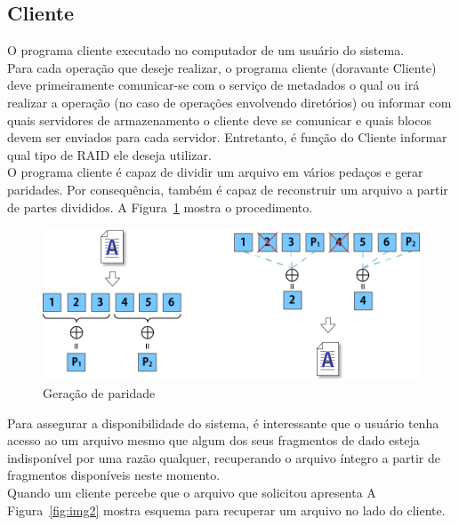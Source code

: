 	\subsection{Cliente}
	O programa cliente executado no computador de um usuário do sistema. 
	\\
	
	Para cada operação que deseje realizar, o programa cliente (doravante Cliente) deve primeiramente comunicar-se com o serviço de metadados o qual ou irá realizar a operação (no caso de operações envolvendo diretórios) ou informar com quais servidores de armazenamento o cliente deve se comunicar e quais blocos devem ser enviados para cada servidor. Entretanto, é função do Cliente informar qual tipo de RAID ele deseja utilizar.
	\\
	
	O programa cliente é capaz de dividir um arquivo em vários pedaços e gerar paridades. Por consequência, também é capaz de reconstruir um arquivo a partir de partes divididos. A Figura~\ref{fig:img6} mostra o procedimento.
	\begin{figure}[htb]
		\begin{center}
			
			\includegraphics[clip,width=15.0cm]{images/image6.png}
			\caption{Geração de paridade}
			\label{fig:img6}
		\end{center}
	\end{figure}
	
	Para assegurar a disponibilidade do sistema, é interessante que o usuário tenha acesso ao um arquivo mesmo que algum dos seus fragmentos de dado esteja indisponível por uma razão qualquer, recuperando o arquivo íntegro a partir de fragmentos disponíveis neste momento.\\
	
	Quando um cliente percebe que o arquivo que solicitou apresenta  
	A Figura~\ref{fig:img2} mostra esquema para recuperar um arquivo no lado do cliente.
	
